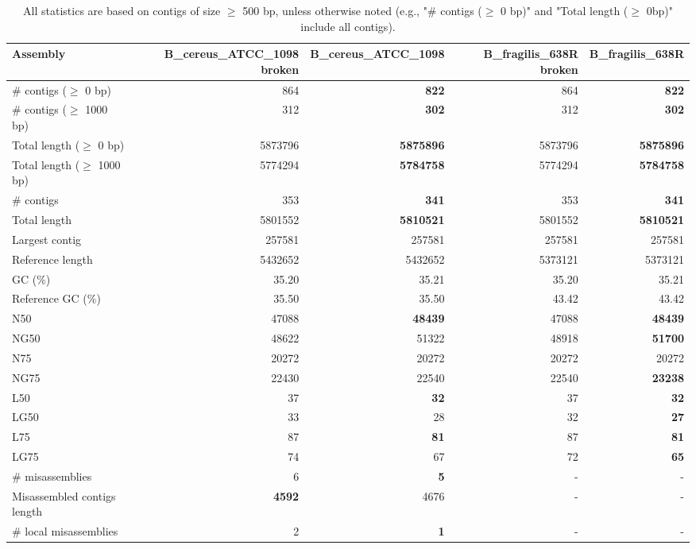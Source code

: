 \documentclass[12pt,a4paper]{article}
\begin{document}
\begin{table}[ht]
\begin{center}
\caption{All statistics are based on contigs of size $\geq$ 500 bp, unless otherwise noted (e.g., "\# contigs ($\geq$ 0 bp)" and "Total length ($\geq$ 0bp)" include all contigs).}
\begin{tabular}{|l*{4}{|r}|}
\hline
Assembly & B\_cereus\_ATCC\_1098 broken & B\_cereus\_ATCC\_1098 & B\_fragilis\_638R broken & B\_fragilis\_638R \\ \hline
\# contigs ($\geq$ 0 bp) & 864 & {\bf 822} & 864 & {\bf 822} \\ \hline
\# contigs ($\geq$ 1000 bp) & 312 & {\bf 302} & 312 & {\bf 302} \\ \hline
Total length ($\geq$ 0 bp) & 5873796 & {\bf 5875896} & 5873796 & {\bf 5875896} \\ \hline
Total length ($\geq$ 1000 bp) & 5774294 & {\bf 5784758} & 5774294 & {\bf 5784758} \\ \hline
\# contigs & 353 & {\bf 341} & 353 & {\bf 341} \\ \hline
Total length & 5801552 & {\bf 5810521} & 5801552 & {\bf 5810521} \\ \hline
Largest contig & 257581 & 257581 & 257581 & 257581 \\ \hline
Reference length & 5432652 & 5432652 & 5373121 & 5373121 \\ \hline
GC (\%) & 35.20 & 35.21 & 35.20 & 35.21 \\ \hline
Reference GC (\%) & 35.50 & 35.50 & 43.42 & 43.42 \\ \hline
N50 & 47088 & {\bf 48439} & 47088 & {\bf 48439} \\ \hline
NG50 & 48622 & 51322 & 48918 & {\bf 51700} \\ \hline
N75 & 20272 & 20272 & 20272 & 20272 \\ \hline
NG75 & 22430 & 22540 & 22540 & {\bf 23238} \\ \hline
L50 & 37 & {\bf 32} & 37 & {\bf 32} \\ \hline
LG50 & 33 & 28 & 32 & {\bf 27} \\ \hline
L75 & 87 & {\bf 81} & 87 & {\bf 81} \\ \hline
LG75 & 74 & 67 & 72 & {\bf 65} \\ \hline
\# misassemblies & 6 & {\bf 5} & - & - \\ \hline
Misassembled contigs length & {\bf 4592} & 4676 & - & - \\ \hline
\# local misassemblies & 2 & {\bf 1} & - & - \\ \hline

\end{tabular}
\end{center}
\end{table}
\end{document}
